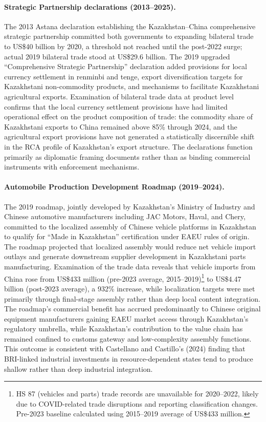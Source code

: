 \documentclass[12pt]{article}
\begin{document}
\paragraph{Strategic Partnership declarations (2013--2025).} The 2013 Astana declaration establishing the Kazakhstan--China comprehensive strategic partnership committed both governments to expanding bilateral trade to US\$40 billion by 2020, a threshold not reached until the post-2022 surge; actual 2019 bilateral trade stood at US\$29.6 billion. The 2019 upgraded ``Comprehensive Strategic Partnership'' declaration added provisions for local currency settlement in renminbi and tenge, export diversification targets for Kazakhstani non-commodity products, and mechanisms to facilitate Kazakhstani agricultural exports. Examination of bilateral trade data at product level confirms that the local currency settlement provisions have had limited operational effect on the product composition of trade: the commodity share of Kazakhstani exports to China remained above 85\% through 2024, and the agricultural export provisions have not generated a statistically discernible shift in the RCA profile of Kazakhstan's export structure. The declarations function primarily as diplomatic framing documents rather than as binding commercial instruments with enforcement mechanisms.

\paragraph{Automobile Production Development Roadmap (2019--2024).} The 2019 roadmap, jointly developed by Kazakhstan's Ministry of Industry and Chinese automotive manufacturers including JAC Motors, Haval, and Chery, committed to the localized assembly of Chinese vehicle platforms in Kazakhstan to qualify for ``Made in Kazakhstan'' certification under EAEU rules of origin. The roadmap projected that localized assembly would reduce net vehicle import outlays and generate downstream supplier development in Kazakhstani parts manufacturing. Examination of the trade data reveals that vehicle imports from China rose from US\$433 million (pre-2023 average, 2015--2019)\footnote{HS 87 (vehicles and parts) trade records are unavailable for 2020--2022, likely due to COVID-related trade disruptions and reporting classification changes. Pre-2023 baseline calculated using 2015--2019 average of US\$433 million.} to US\$4.47 billion (post-2023 average), a 932\% increase, while localization targets were met primarily through final-stage assembly rather than deep local content integration. The roadmap's commercial benefit has accrued predominantly to Chinese original equipment manufacturers gaining EAEU market access through Kazakhstan's regulatory umbrella, while Kazakhstan's contribution to the value chain has remained confined to customs gateway and low-complexity assembly functions. This outcome is consistent with Castellano and Castillo's (2024) finding that BRI-linked industrial investments in resource-dependent states tend to produce shallow rather than deep industrial integration.
\end{document}
